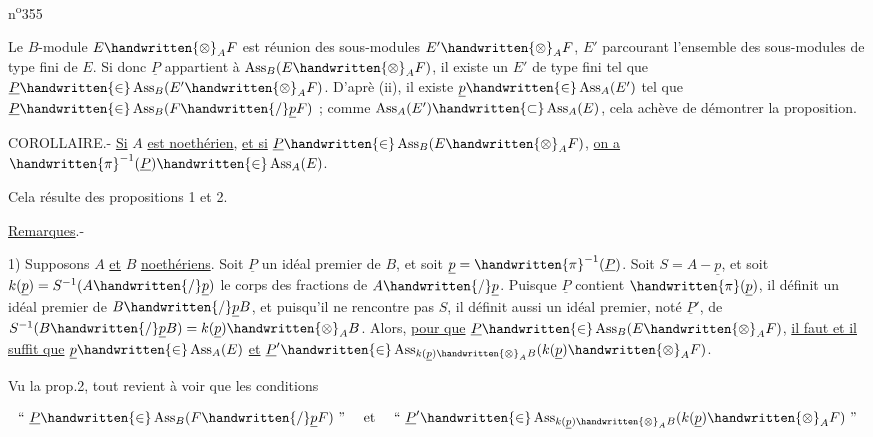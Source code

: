 \noindent\hfill n\textsuperscript{o}355

Le $B$-module $E\handwritten{\otimes}_A F$ est réunion des sous-modules $E'\handwritten{\otimes}_A F$, $E'$ parcourant l'ensemble des sous-modules de type fini de $E$. Si donc $\underline P$ appartient à $\operatorname{Ass}_B(E\handwritten{\otimes}_A F)$, il existe un $E'$ de type fini tel que $\underline P\handwritten{\in}\operatorname{Ass}_B(E'\handwritten{\otimes}_A F)$. D'aprè (ii), il existe $\underline p\handwritten{\in}\operatorname{Ass}_A(E')$ tel que $\underline P\handwritten{\in}\operatorname{Ass}_B(F\handwritten{/}\underline p F)$ ; comme $\operatorname{Ass}_A(E')\handwritten{\subset}\operatorname{Ass}_A(E)$, cela achève de démontrer la proposition.

COROLLAIRE.- \uline{Si} $A$ \uline{est noethérien}, \uline{et si} $\underline P\handwritten{\in}\operatorname{Ass}_B(E\handwritten{\otimes}_A F)$, \uline{on a} $\handwritten{\pi}^{-1}(\underline P)\handwritten{\in}\operatorname{Ass}_A(E)$.

Cela résulte des propositions 1 et 2.

\uline{Remarques}.-

1) Supposons $A$ \uline{et} $B$ \uline{noethériens}. Soit $\underline P$ un idéal premier de $B$, et soit $\underline p=\handwritten{\pi}^{-1}(\underline P)$. Soit $S=A-\underline p$, et soit $k(\underline p)=S^{-1}(A\handwritten{/}\underline p)$ le corps des fractions de $A\handwritten{/}\underline p$. Puisque $\underline P$ contient $\handwritten{\pi}(\underline p)$, il définit un idéal premier de $B\handwritten{/}\underline p B$, et puisqu'il ne rencontre pas $S$, il définit aussi un idéal premier, noté $\underline P'$, de $S^{-1}(B\handwritten{/}\underline p B)=k(\underline p)\handwritten{\otimes}_A B$. Alors, \uline{pour que} $\underline P\handwritten{\in}\operatorname{Ass}_B(E\handwritten{\otimes}_A F)$, \uline{il faut et il suffit que} $\underline p\handwritten{\in}\operatorname{Ass}_A(E)$ \uline{et} $\underline P'\handwritten{\in}\operatorname{Ass}_{k(\underline p)\handwritten{\otimes}_A B}(k(\underline p)\handwritten{\otimes}_A F)$.

Vu la prop.2, tout revient à voir que les conditions

\[
\text{`` }\underline P\handwritten{\in}\operatorname{Ass}_B(F\handwritten{/}\underline p F)\text{ '' \quad et \quad `` }\underline P'\handwritten{\in}\operatorname{Ass}_{k(\underline p)\handwritten{\otimes}_A B}(k(\underline p)\handwritten{\otimes}_A F)\text{ ''}
\]

